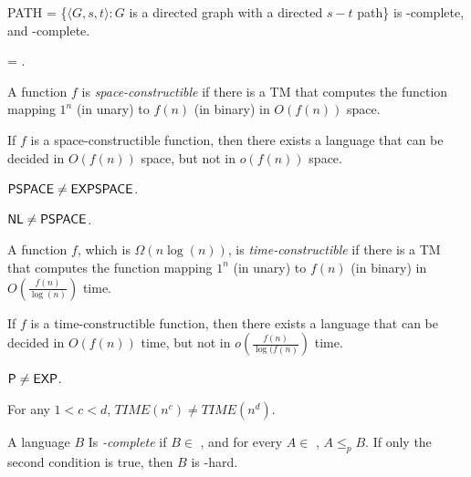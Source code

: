 \begin{theorem}
PATH = \{$\langle G, s, t\rangle : G$ is a directed graph with a directed $s-t$ path\} is \NL-complete, and \coNL-complete.
\end{theorem}

\begin{corollary}
\NL = \coNL.
\end{corollary}

\begin{definition}
A function $f$ is \emph{space-constructible} if there is a TM that computes the function mapping $1^n$ (in unary) to $f(n)$ (in binary) in $O(f(n))$ space.
\end{definition}

\begin{theorem}
If $f$ is a space-constructible function, then there exists a language that can be decided in $O(f(n))$ space, but not in $o(f(n))$ space.
\end{theorem}

\begin{corollary}
${\mathsf{PSPACE}} \ne {\ensuremath{\mathsf{EXPSPACE}}}$.
\end{corollary}

\begin{corollary}
${\mathsf{NL}} \ne {\ensuremath{\mathsf{PSPACE}}}$.
\end{corollary}

\begin{definition}
A function $f$, which is $\Omega(n\log(n))$, is \emph{time-constructible} if there is a TM that computes the function mapping $1^n$ (in unary) to $f(n)$ (in binary) in $O(\frac{f(n)}{\log(n)})$ time.
\end{definition}

\begin{theorem}
If $f$ is a time-constructible function, then there exists a language that can be decided in $O(f(n))$ time, but not in $o(\frac{f(n)}{\log(f(n)})$ time.
\end{theorem}

\begin{corollary}
${\mathsf{P}} \ne {\ensuremath{\mathsf{EXP}}}$.
\end{corollary}

\begin{corollary}
For any $1 < c < d$, $TIME(n^c) \ne TIME(n^d)$.
\end{corollary}

\begin{definition}
A language $B$ Is \emph{\EXPSPACE-complete} if $B \in$ \EXPSPACE, and for every $A \in$ \EXPSPACE, $A \le_p B$. If only the second condition is true, then $B$ is \EXPSPACE-hard.
\end{definition}

